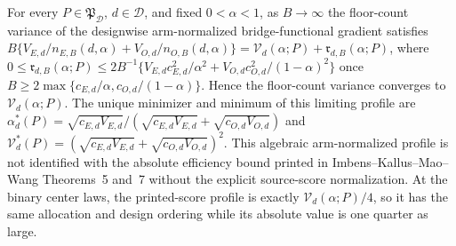 For every \(P\in\mathfrak P_{\mathcal D}\), \(d\in\mathcal D\), and fixed \(0<\alpha<1\), as \(B\to\infty\) the floor-count variance of the designwise arm-normalized bridge-functional gradient satisfies \(B\{V_{E,d}/n_{E,B}(d,\alpha)+V_{O,d}/n_{O,B}(d,\alpha)\}=\mathcal V_d(\alpha;P)+\mathfrak r_{d,B}(\alpha;P)\), where \(0\le\mathfrak r_{d,B}(\alpha;P)\le 2B^{-1}\{V_{E,d}c_{E,d}^2/\alpha^2+V_{O,d}c_{O,d}^2/(1-\alpha)^2\}\) once \(B\ge2\max\{c_{E,d}/\alpha,c_{O,d}/(1-\alpha)\}\). Hence the floor-count variance converges to \(\mathcal V_d(\alpha;P)\). The unique minimizer and minimum of this limiting profile are \(\alpha_d^*(P)=\sqrt{c_{E,d}V_{E,d}}/(\sqrt{c_{E,d}V_{E,d}}+\sqrt{c_{O,d}V_{O,d}})\) and \(\mathcal V_d^*(P)=(\sqrt{c_{E,d}V_{E,d}}+\sqrt{c_{O,d}V_{O,d}})^2\).  This algebraic arm-normalized profile is not identified with the absolute efficiency bound printed in Imbens--Kallus--Mao--Wang Theorems~5 and~7 without the explicit source-score normalization.  At the binary center laws, the printed-score profile is exactly \(\mathcal V_d(\alpha;P)/4\), so it has the same allocation and design ordering while its absolute value is one quarter as large.